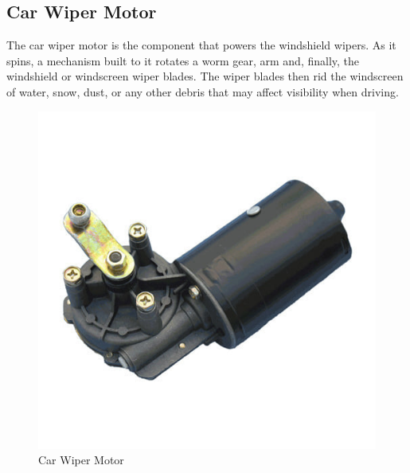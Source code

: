 \documentclass[a4paper,12pt]{report}
\begin{document}
\subsection{Car Wiper Motor}
The car wiper motor is the component that powers the windshield wipers. As it spins, a
mechanism built to it rotates a worm gear, arm and, finally, the windshield or windscreen
wiper blades. The wiper blades then rid the windscreen of water, snow, dust, or any other
debris that may affect visibility when driving.
\begin{figure}[h] %
   \begin{center}
   \includegraphics[scale=0.3]{car.jpg}
   \caption{Car Wiper Motor}
  \end{center}
  \end{figure}
\end{document}

